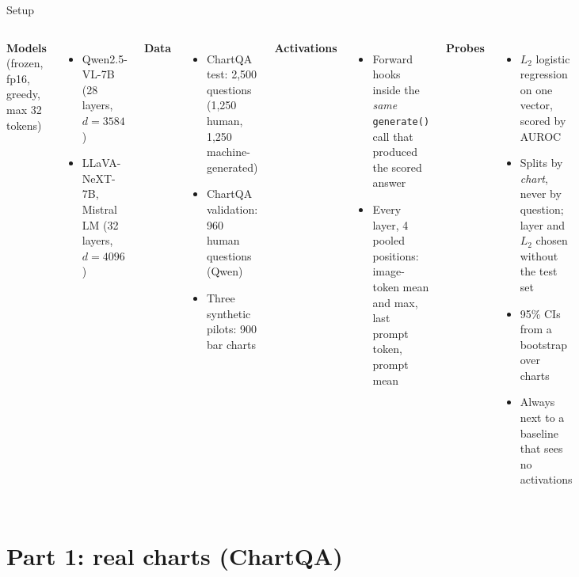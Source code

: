 \documentclass[10pt,aspectratio=169]{beamer}
\begin{document}
\begin{frame}{Setup}
\begin{columns}[T]
\footnotesize
\textbf{Models} (frozen, fp16, greedy, max 32 tokens)
\begin{itemize}
\item Qwen2.5-VL-7B (28 layers, $d=3584$)
\item LLaVA-NeXT-7B, Mistral LM (32 layers, $d=4096$)
\end{itemize}
\textbf{Data}
\begin{itemize}
\item ChartQA test: 2,500 questions (1,250 human, 1,250 machine-generated)
\item ChartQA validation: 960 human questions (Qwen)
\item Three synthetic pilots: 900 bar charts
\end{itemize}
\footnotesize
\textbf{Activations}
\begin{itemize}
\item Forward hooks inside the \emph{same} \texttt{generate()} call that produced
the scored answer
\item Every layer, 4 pooled positions: image-token mean and max, last prompt
token, prompt mean
\end{itemize}
\textbf{Probes}
\begin{itemize}
\item $L_2$ logistic regression on one vector, scored by AUROC
\item Splits by \emph{chart}, never by question; layer and $L_2$ chosen without
the test set
\item 95\% CIs from a bootstrap over charts
\item Always next to a baseline that sees no activations
\end{itemize}
\end{columns}
\end{frame}

\section{Part 1: real charts (ChartQA)}
\end{document}
